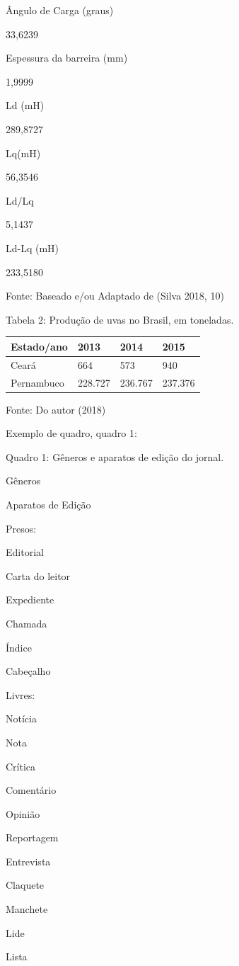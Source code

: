 \documentclass[
]{article}
\begin{document}
Ângulo de Carga (graus)

33,6239

Espessura da barreira (mm)

1,9999

Ld (mH)

289,8727

Lq(mH)

56,3546

Ld/Lq

5,1437

Ld-Lq (mH)

233,5180

Fonte: Baseado e/ou Adaptado de (Silva 2018, 10)

Tabela 2: Produção de uvas no Brasil, em toneladas.

\begin{longtable}[]{@{}llll@{}}
\toprule\noalign{}
\textbf{Estado/ano} & \textbf{2013} & \textbf{2014} & \textbf{2015} \\
\midrule\noalign{}
\endhead
\bottomrule\noalign{}
\endlastfoot
Ceará & 664 & 573 & 940 \\
Pernambuco & 228.727 & 236.767 & 237.376 \\
\end{longtable}

Fonte: Do autor (2018)

Exemplo de quadro, quadro 1:

Quadro 1: Gêneros e aparatos de edição do jornal.

Gêneros

Aparatos de Edição

Presos:

Editorial

Carta do leitor

Expediente

Chamada

Índice

Cabeçalho

Livres:

Notícia

Nota

Crítica

Comentário

Opinião

Reportagem

Entrevista

Claquete

Manchete

Lide

Lista
\end{document}
